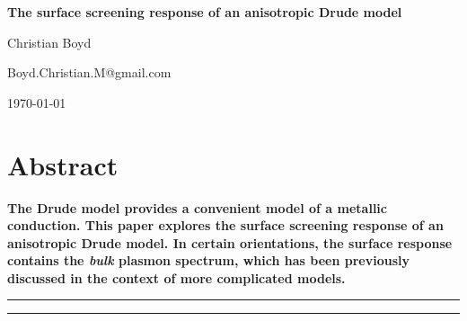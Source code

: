 \begin{center}{\Large \textbf{
The surface screening response of an anisotropic Drude model
}}\end{center}

\begin{center}
Christian Boyd
\end{center}

\begin{center}
{\small \sf Boyd.Christian.M@gmail.com}
\end{center}

\begin{center}
\today
\end{center}


\section*{Abstract}
{\bf
The Drude model provides a convenient model of a metallic conduction.  This paper explores the surface screening response of an anisotropic Drude model.  In certain orientations, the surface response contains the {\it bulk} plasmon spectrum, which has been previously discussed in the context of more complicated models.
}

\vspace{10pt}
\noindent\rule{\textwidth}{1pt}
\tableofcontents
\noindent\rule{\textwidth}{1pt}
\vspace{10pt}